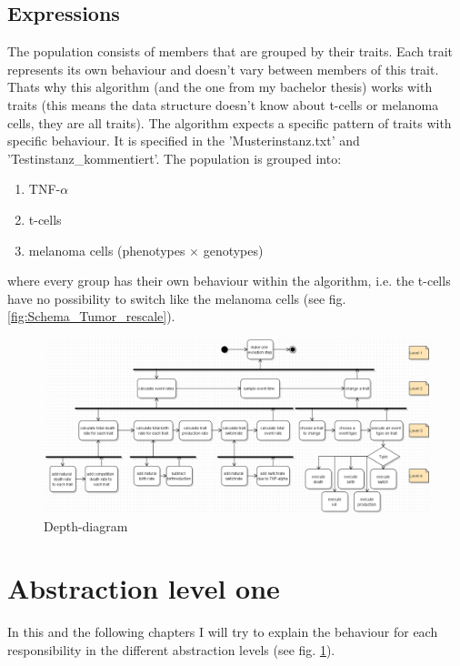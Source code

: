 \documentclass[a4paper,10pt]{scrartcl}
\begin{document}
\subsection{Expressions}
The population consists of members that are grouped by their traits. Each trait represents its own behaviour and doesn't vary between members of this trait. Thats why this algorithm (and the one from my bachelor thesis) works with traits (this means the data structure doesn't know about t-cells or melanoma cells, they are all traits).
The algorithm expects a specific pattern of traits with specific behaviour. It is specified in the 'Musterinstanz.txt' and 'Testinstanz\_kommentiert'. The population is grouped into:
\begin{enumerate}
	\item TNF-$ \alpha $
	\item t-cells
	\item melanoma cells (phenotypes $ \times $ genotypes)		
\end{enumerate}
where every group has their own behaviour within the algorithm, i.e. the t-cells have no possibility to switch like the melanoma cells (see fig. \ref{fig:Schema_Tumor_rescale}).
\begin{figure}
	\centering
	\includegraphics[width=1\linewidth]{../UML/Tiefendiagram}
	\caption{Depth-diagram}
	\label{fig:Tiefendiagram}
\end{figure}

\section{Abstraction level one}
In this and the following chapters I will try to explain the behaviour for each responsibility in the different abstraction levels (see fig. \ref{fig:Tiefendiagram}).
\end{document}
